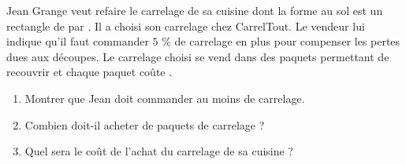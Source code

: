 \begin{exercice*}[Carrelage]
    Jean Grange veut refaire le carrelage de sa cuisine dont la forme au sol est un 
    rectangle de  par . Il a choisi son carrelage chez CarrelTout. Le vendeur
    lui indique qu'il faut commander $5$ \% de carrelage en plus pour compenser les
    pertes dues aux découpes. Le carrelage choisi se vend dans des paquets permettant de 
    recouvrir  et chaque paquet coûte .    
    \begin{enumerate}
        \item Montrer que Jean doit commander au moins  de carrelage.
        \item Combien doit-il acheter de paquets de carrelage ?
        \item Quel sera le coût de l'achat du carrelage de sa cuisine ?    
    \end{enumerate}
\end{exercice*}
 

